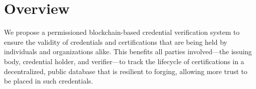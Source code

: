 \section{Overview}

We propose a permissioned blockchain-based credential verification system to ensure the validity of credentials and certifications that are being held by individuals and organizations alike. This benefits all parties involved—the issuing body, credential holder, and verifier—to track the lifecycle of certifications in a decentralized, public database that is resilient to forging, allowing more trust to be placed in such credentials.

